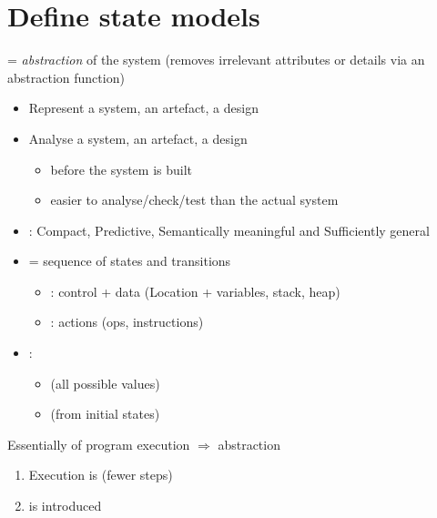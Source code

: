 \section{Define state models}

 = \textit{abstraction} of the system (removes irrelevant attributes or details via an abstraction function)
\begin{itemize}
    \item Represent a system, an artefact, a design
    \item Analyse a system, an artefact, a design
    \begin{itemize}
        \item before the system is built
        \item easier to analyse/check/test than the actual system
    \end{itemize}
    \item {} : Compact, Predictive, Semantically meaningful and Sufficiently general
\end{itemize}

\begin{itemize}
    \item {} = sequence of states and transitions
    \begin{itemize}
        \item {} : control + data (Location + variables, stack, heap)
        \item {} : actions (ops, instructions)
    \end{itemize}
    \item {} :
    \begin{itemize}
        \item {} (all possible values)
        \item {} (from initial states)
    \end{itemize}
\end{itemize}

Essentially 
 of program execution $\Rightarrow$ abstraction
\begin{enumerate}
    \item Execution is  (fewer steps)
    \item {} is introduced
\end{enumerate}

